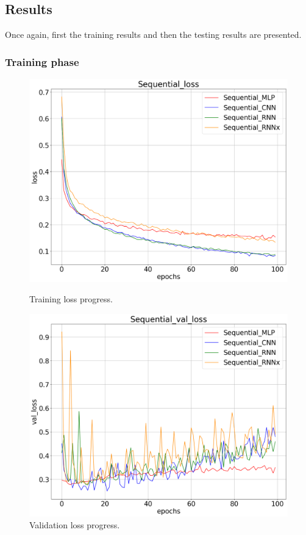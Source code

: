 \subsection{Results}
Once again, first the training results and then the testing results are presented.

\subsubsection{Training phase}
\begin{figure}[!h]
    \centering
    \begin{minipage}{0.48\textwidth}
        \centering
        \includegraphics[width=\linewidth]{obrazky-figures/Sequential_experiment/loss_2023-03-29_14:45:07.png}
        \caption{Training loss progress.}
        \label{graph-sequential-loss}
    \end{minipage}\hfill
    \begin{minipage}{0.48\textwidth}
        \centering
        \includegraphics[width=\linewidth]{obrazky-figures/Sequential_experiment/val_loss_2023-03-29_14:45:07.png}
        \caption{Validation loss progress.}
        \label{graph-sequential-val_loss}
    \end{minipage}
\end{figure}
